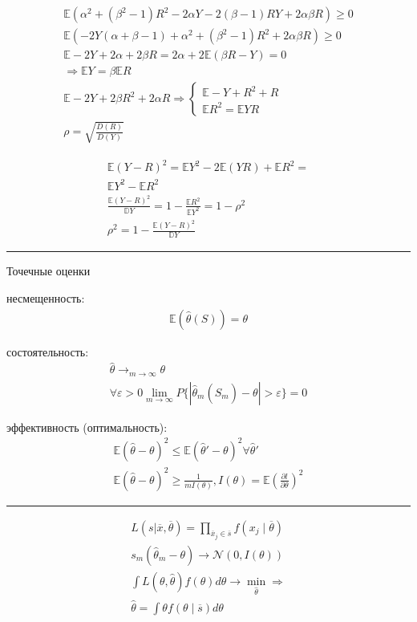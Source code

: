\documentclass{book}
\begin{document}
\begin{gather*}
  \mathbb{E}(\alpha^2+(\beta^2-1)R^2-2\alpha Y - 2(\beta-1)RY+2\alpha\beta R) \geq 0\\
  \mathbb{E}(-2Y(\alpha+\beta-1)+\alpha^2+(\beta^2-1)R^2+2\alpha\beta R)\geq 0\\
  \mathbb{E}-2Y+2\alpha+2\beta R = 2\alpha + 2 \mathbb{E}(\beta R - Y) = 0\\
  \Rightarrow \mathbb{E}Y=\beta \mathbb{E}R\\
  \mathbb{E}-2Y+2\beta R^2+2\alpha R \Rightarrow
  \begin{cases}
      \mathbb{E}-Y+R^2+R\\
      \mathbb{E}R^2=\mathbb{E}YR
  \end{cases}\\
  \rho=\sqrt{\frac{D(R)}{D(Y)}}
\end{gather*}

\begin{gather*}
  \mathbb{E}(Y-R)^2=\mathbb{E}Y^2-2\mathbb{E}(YR)+\mathbb{E}R^2=\\
  \mathbb{E}Y^2-\mathbb{E}R^2\\
  \frac{\mathbb{E}(Y-R)^2}{\mathbb{D}Y}=1-\frac{\mathbb{E}R^2}{\mathbb{E}Y^2}=1-\rho^2\\
  \rho^2=1-\frac{\mathbb{E}(Y-R)^2}{\mathbb{D}Y}
\end{gather*}

\hrule
Точечные оценки

несмещенность: 
\begin{gather*}
  \mathbb{E}(\hat{\theta}(S))=\theta
\end{gather*}

состоятельность: 
\begin{gather*}
  \hat{\theta} \rightarrow_{m\rightarrow\infty}\theta\\
  \forall \varepsilon > 0 \lim_{m\rightarrow \infty} {P\{|\hat{\theta}_m(\hat{S}_m)-\theta|>\varepsilon\}}=0
\end{gather*}

эффективность (оптимальность):
\begin{gather*}
  \mathbb{E}(\hat{\theta}-\theta)^2\leq \mathbb{E}(\hat{\theta}'-\theta)^2 \forall \hat{\theta}'\\
  \mathbb{E}(\hat{\theta}-\theta)^2\geq \frac{1}{mI(\theta)}, I(\theta)=\mathbb{E}\left(\frac{\partial l}{\partial \theta}\right)^2
\end{gather*}

\hrule

\begin{gather*}
  L(s|\overline{x},\overline{\theta})=\prod_{\overline{x}_j \in \overline{s}}^{} {f(x_j\mid \overline{\theta})}\\
  s_m(\hat{\theta}_m-\theta) \rightarrow \mathcal{N}(0, I(\theta))\\
  \int {L(\theta,\hat{\theta})f(\theta)d\theta} \rightarrow \min_{\hat{\theta}} \Rightarrow\\
  \hat{\theta}=\int {\theta f(\theta\mid \overline{s}) d\theta}
\end{gather*}
\end{document}
